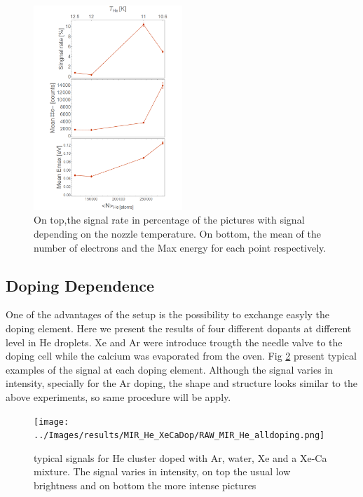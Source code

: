 \begin{figure}[h!]
\centering
\includegraphics[width=0.5\textwidth]{../Images/results/Mir_He_Dropletsize/Alltogether.png} 
\caption[MIR He droplet size dependence]{On top,the signal rate in percentage of the pictures with signal depending on the nozzle temperature. On bottom, the mean of the number of electrons and the Max energy for each point respectively.}
\label{fig:Alldropletsize}
\end{figure}

\subsection{Doping Dependence}

One of the advantages of the setup is the possibility to exchange easyly the doping element. Here we present the results of four different dopants at different level in He droplets. Xe and Ar were introduce trougth the needle valve to the doping cell while the calcium was evaporated from the oven. Fig \ref{fig:He-dopingexample} present typical examples of the signal at each doping element. Although the signal varies in intensity, specially for the Ar doping, the  shape and structure looks similar to the above experiments, so same procedure will be apply.

\begin{figure}[h!]
\centering
\texttt{[image: ../Images/results/MIR\_He\_XeCaDop/RAW\_MIR\_He\_alldoping.png]} 
\caption[MIR HeDoping examples]{typical signals for He cluster doped with Ar, water, Xe and a Xe-Ca mixture. The signal varies in intensity, on top the usual low brightness and on bottom the more intense pictures}
\label{fig:He-dopingexample}
\end{figure}

